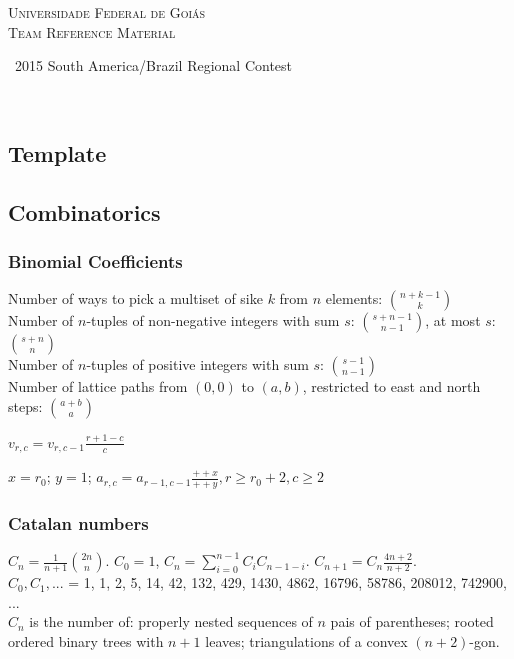 \documentclass[a4paper,12pt]{article}
\newcommand\includesfile[4]{
  \subsection{#2}
  \begin{multicols}{2}
    
  \end{multicols}
}
\begin{document}
\thispagestyle{fancy}
\begin{center}
  \Huge\textsc{Universidade Federal de Goiás \\ Team Reference Material}
	
	\
	\small 2015 South America/Brazil Regional Contest
\end{center}

\begin{multicols}{2}
  \tableofcontents
\end{multicols}

\


\newpage

\includesfile{c++}{Template}{config}{template.cpp}

\subsection{Combinatorics}
\subsubsection{Binomial Coefficients}

Number of ways to pick a multiset of sike $k$ from $n$ elements: $\binom{n+k-1}{k}$\\
Number of $n$-tuples of non-negative integers with sum $s$: $\binom{s+n-1}{n-1}$, at most $s$: $\binom{s+n}{n}$\\
Number of $n$-tuples of positive integers with sum $s$: $\binom{s-1}{n-1}$\\
Number of lattice paths from $(0,0)$ to $(a,b)$, restricted to east and north steps: $\binom{a+b}{a}$

$v_{r,c} = v_{r,c-1} \frac{r+1-c}{c}$

$x = r_0$; $y = 1$; $a_{r,c} = a_{r-1,c-1}  \frac{++x}{++y}, r \geq r_0+2, c \geq 2$

\subsubsection{Catalan numbers}
$C_{n} = \frac{1}{n+1}\binom{2n}{n}$. $C_0 = 1$,  $C_{n} = \sum_{i=0}^{n-1}C_iC_{n-1-i}$. $C_{n+1} = C_{n}\frac{4n+2}{n+2}$.\\
$C_0,C_1,... $ = 1, 1, 2, 5, 14, 42, 132, 429, 1430, 4862, 16796, 58786, 208012, 742900, ...\\
$C_{n}$ is the number of: properly nested sequences of $n$ pais of parentheses; rooted ordered binary trees with $n+1$ leaves; triangulations of a convex $(n+2)$-gon.
\end{document}

